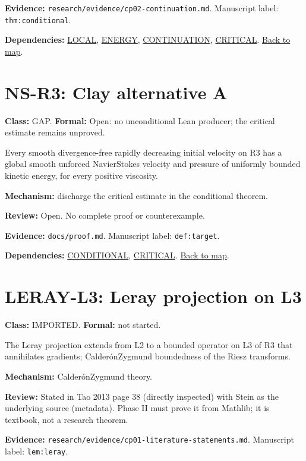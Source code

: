 \documentclass[10pt]{article}
\begin{document}
\textbf{Evidence:} \texttt{research/evidence/cp02-continuation.md}. Manuscript label: \texttt{thm:conditional}.

\textbf{Dependencies:} \hyperref[node:LOCAL]{LOCAL}, \hyperref[node:ENERGY]{ENERGY}, \hyperref[node:CONTINUATION]{CONTINUATION}, \hyperref[node:CRITICAL]{CRITICAL}. \hyperref[map]{Back to map}.

\section*{NS-R3: Clay alternative A}\label{node:NS-R3}
\textbf{Class:} GAP. \textbf{Formal:} Open: no unconditional Lean producer; the critical estimate remains unproved.

Every smooth divergence-free rapidly decreasing initial velocity on R3 has a global smooth unforced Navier\textendash{}\allowbreak{}Stokes velocity and pressure of uniformly bounded kinetic energy, for every positive viscosity.

\textbf{Mechanism:} discharge the critical estimate in the conditional theorem.

\textbf{Review:} Open. No complete proof or counterexample.

\textbf{Evidence:} \texttt{docs/proof.md}. Manuscript label: \texttt{def:target}.

\textbf{Dependencies:} \hyperref[node:CONDITIONAL]{CONDITIONAL}, \hyperref[node:CRITICAL]{CRITICAL}. \hyperref[map]{Back to map}.

\section*{LERAY-L3: Leray projection on L3}\label{node:LERAY-L3}
\textbf{Class:} IMPORTED. \textbf{Formal:} not started.

The Leray projection extends from L2 to a bounded operator on L3 of R3 that annihilates gradients; Calderón\textendash{}\allowbreak{}Zygmund boundedness of the Riesz transforms.

\textbf{Mechanism:} Calderón\textendash{}\allowbreak{}Zygmund theory.

\textbf{Review:} Stated in Tao 2013 page 38 (directly inspected) with Stein as the underlying source (metadata). Phase II must prove it from Mathlib; it is textbook, not a research theorem.

\textbf{Evidence:} \texttt{research/evidence/cp01-literature-statements.md}. Manuscript label: \texttt{lem:leray}.
\end{document}
